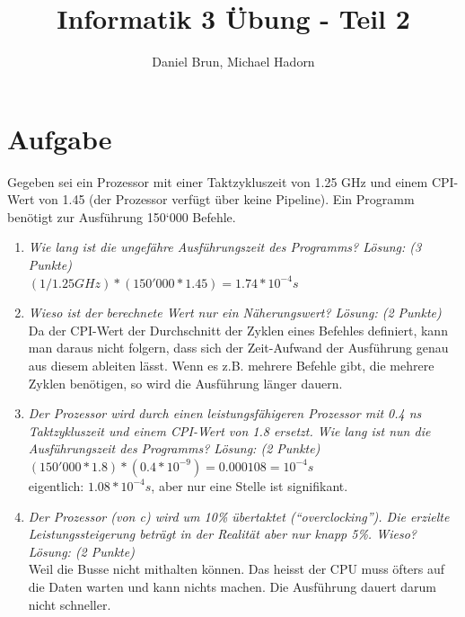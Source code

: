 \documentclass[10pt]{article}
\title{Informatik 3 Übung - Teil 2\vspace{-2ex}}
\author{Daniel Brun, Michael Hadorn\vspace{-2ex}}
\begin{document}
\maketitle

\section{Aufgabe}
Gegeben sei ein Prozessor mit einer Taktzykluszeit von 1.25 GHz und einem CPI-Wert von 1.45 (der Prozessor verfügt über keine Pipeline). Ein Programm benötigt zur Ausführung 150‘000 Befehle.

\begin{enumerate}[label=\alph*)]
	\item 
	\textit{Wie lang ist die ungefähre Ausführungszeit des	Programms? Lösung: (3 Punkte)}\\
	$ (1 / 1.25 GHz)*(150'000 * 1.45) = 1.74 * 10^{-4} s$
	
	\item
	\textit{Wieso ist der berechnete Wert nur ein Näherungswert? Lösung: (2 Punkte)}\\
	Da der CPI-Wert der Durchschnitt der Zyklen eines Befehles definiert, kann man daraus nicht folgern, dass sich der Zeit-Aufwand der Ausführung genau aus diesem ableiten lässt. Wenn es z.B. mehrere Befehle gibt, die mehrere Zyklen benötigen, so wird die Ausführung länger dauern.
	\item
	\textit{Der Prozessor wird durch einen leistungsfähigeren Prozessor mit 0.4 ns Taktzykluszeit und einem CPI-Wert von 1.8 ersetzt. Wie lang ist nun die Ausführungszeit des Programms? Lösung: (2 Punkte)}\\
	
	$ (150'000*1.8)*(0.4*10^{-9}) = 0.000108 = 10^{-4} s$\\
	eigentlich: $1.08*10^{-4} s$, aber nur eine Stelle ist signifikant.
			
	\item
	\textit{Der Prozessor (von c) wird um 10\% übertaktet ("`overclocking"'). Die erzielte Leistungssteigerung beträgt in der Realität aber nur knapp 5\%. Wieso? 	Lösung: (2 Punkte)}\\
	
	Weil die Busse nicht mithalten können. Das heisst	der CPU muss öfters auf die Daten warten und kann nichts machen. Die Ausführung dauert darum nicht schneller.
	
\end{enumerate}
\newpage
\end{document}
